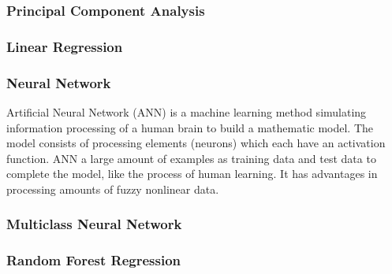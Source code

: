 \documentclass[titlepage]{article}
\begin{document}
\subsubsection*{Principal Component Analysis}
\subsubsection*{Linear Regression}
\subsubsection*{Neural Network}
Artificial Neural Network (ANN) is a machine learning method simulating information processing of a human brain to build a mathematic model. The model consists of processing elements (neurons) which each have an activation function. ANN a large amount of examples as training data and test data to complete the model, like the process of human learning. It has advantages in processing amounts of fuzzy nonlinear data.
\subsubsection*{Multiclass Neural Network}
\subsubsection*{Random Forest Regression}
\end{document}
